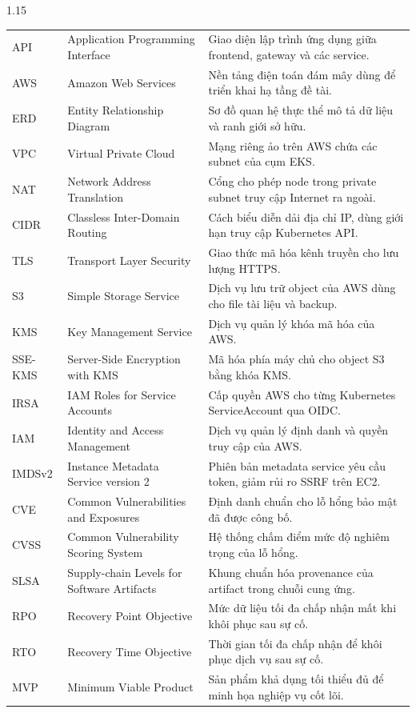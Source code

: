 \begin{spacing}{1.15}
\begin{longtable}{p{}p{}p{}}
API & Application Programming Interface & Giao diện lập trình ứng dụng giữa frontend, gateway và các service. \\
AWS & Amazon Web Services & Nền tảng điện toán đám mây dùng để triển khai hạ tầng đề tài. \\
ERD & Entity Relationship Diagram & Sơ đồ quan hệ thực thể mô tả dữ liệu và ranh giới sở hữu. \\
VPC & Virtual Private Cloud & Mạng riêng ảo trên AWS chứa các subnet của cụm EKS. \\
NAT & Network Address Translation & Cổng cho phép node trong private subnet truy cập Internet ra ngoài. \\
CIDR & Classless Inter-Domain Routing & Cách biểu diễn dải địa chỉ IP, dùng giới hạn truy cập Kubernetes API. \\
TLS & Transport Layer Security & Giao thức mã hóa kênh truyền cho lưu lượng HTTPS. \\
S3 & Simple Storage Service & Dịch vụ lưu trữ object của AWS dùng cho file tài liệu và backup. \\
KMS & Key Management Service & Dịch vụ quản lý khóa mã hóa của AWS. \\
SSE-KMS & Server-Side Encryption with KMS & Mã hóa phía máy chủ cho object S3 bằng khóa KMS. \\
IRSA & IAM Roles for Service Accounts & Cấp quyền AWS cho từng Kubernetes ServiceAccount qua OIDC. \\
IAM & Identity and Access Management & Dịch vụ quản lý định danh và quyền truy cập của AWS. \\
IMDSv2 & Instance Metadata Service version 2 & Phiên bản metadata service yêu cầu token, giảm rủi ro SSRF trên EC2. \\
CVE & Common Vulnerabilities and Exposures & Định danh chuẩn cho lỗ hổng bảo mật đã được công bố. \\
CVSS & Common Vulnerability Scoring System & Hệ thống chấm điểm mức độ nghiêm trọng của lỗ hổng. \\
SLSA & Supply-chain Levels for Software Artifacts & Khung chuẩn hóa provenance của artifact trong chuỗi cung ứng. \\
RPO & Recovery Point Objective & Mức dữ liệu tối đa chấp nhận mất khi khôi phục sau sự cố. \\
RTO & Recovery Time Objective & Thời gian tối đa chấp nhận để khôi phục dịch vụ sau sự cố. \\
MVP & Minimum Viable Product & Sản phẩm khả dụng tối thiểu đủ để minh họa nghiệp vụ cốt lõi. \\
\bottomrule
\end{longtable}
\endgroup
\end{spacing}
